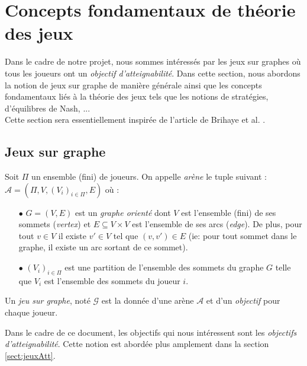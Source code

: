 
\section{Concepts fondamentaux de théorie des jeux}
Dans le cadre de notre projet, nous sommes intéressés par les jeux sur graphes où tous les joueurs ont un \textit{objectif d'atteignabilité}.
Dans cette section, nous abordons la notion de jeux sur graphe de manière générale ainsi que les concepts fondamentaux liés à la théorie des jeux tels que les notions de stratégies, d'équilibres de Nash, ...\\
Cette section sera essentiellement inspirée de l'article de Brihaye et al. \cite{DBLP:conf/lfcs/BrihayePS13}.

\subsection{Jeux sur graphe}




\begin{defi}[Arène]
	Soit $\Pi$ un ensemble (fini) de joueurs. On appelle \textit{arène} le tuple suivant :\\
	 $\mathcal{A} = (\Pi,V , (V_{i})_{i\in{\Pi}}, E )$ où :
	\begin{enumerate}
		\item[$\bullet$] $G = (V,E)$ est un \textit{graphe orienté}  dont $V$ est l'ensemble (fini) de ses sommets (\textit{vertex}) et $E \subseteq V \times V$ est l'ensemble de ses arcs (\textit{edge}). De plus, pour tout $ v\in V $ il existe $v'\in V$ tel que $(v,v') \in E$ (ie: pour tout sommet dans le graphe, il existe un arc sortant de ce sommet).
		\item[$\bullet$] $(V_{i})_{i\in\Pi}$ est une partition de l'ensemble des sommets du graphe $G$ telle que $V_{i}$ est l'ensemble des sommets du joueur $i$.
	\end{enumerate}
\end{defi}


\begin{defi}
	Un \textit{jeu sur graphe}, noté $\mathcal{G}$ est la donnée d'une arène $\mathcal{A}$ et d'un \textit{objectif} pour chaque joueur.
\end{defi}

\begin{rem}
	Dans le cadre de ce document, les objectifs qui nous intéressent sont les \textit{objectifs d'atteignabilité}. Cette notion est abordée plus amplement dans la section \ref{sect:jeuxAtt}.
\end{rem}

